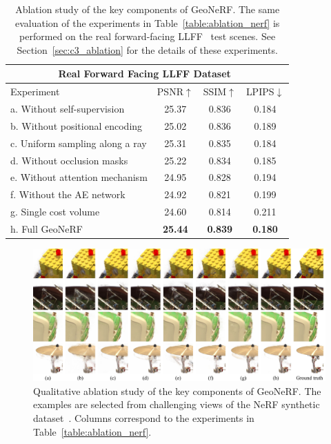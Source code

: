 \begin{table}[!t]
	\begin{center}
		\begin{tabular}{l|ccc}
			\hline
                \multicolumn{4}{c}{Real Forward Facing LLFF Dataset~\cite{mildenhall2019llff}} \\
                \hline
			Experiment & PSNR$\uparrow$ &  SSIM$\uparrow$ & LPIPS$\downarrow$ \\
			\hline
			a. Without self-supervision & 25.37 & 0.836 & 0.184 \\
			b. Without positional encoding & 25.02 & 0.836 & 0.189 \\
			c. Uniform sampling along a ray & 25.31 & 0.835 & 0.184 \\
			d. Without occlusion masks & 25.22 & 0.834 & 0.185 \\
			e. Without attention mechanism & 24.95 & 0.828 & 0.194 \\
			f. Without the AE network & 24.92 & 0.821 & 0.199 \\
			g. Single cost volume & 24.60 & 0.814 & 0.211 \\
			h. Full GeoNeRF & \textbf{25.44} & \textbf{0.839} & \textbf{0.180}\\
			\hline
		\end{tabular}
	\end{center}
	\caption{Ablation study of the key components of GeoNeRF. The same evaluation of the experiments in Table~\ref{table:ablation_nerf} is performed on the real forward-facing LLFF~\cite{mildenhall2019llff} test scenes. See Section~\ref{sec:c3_ablation} for the details of these experiments.}
	\label{table:ablation_llff}
\end{table}

\begin{figure}
	\begin{center}
		\includegraphics[width=1.0\linewidth]{images/chapter3/figures/ablation.jpg}
	\end{center}
	\caption{Qualitative ablation study of the key components of GeoNeRF. The examples are selected from challenging views of the NeRF synthetic dataset~\cite{mildenhall2020nerf}. Columns correspond to the experiments in Table~\ref{table:ablation_nerf}.}
	\label{fig:c3_ablation}
\end{figure}

